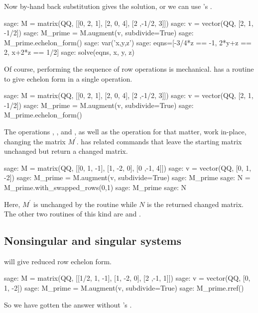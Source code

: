 Now by-hand back substitution gives the solution, or we can 
use \Sage's .
\begin{sagecommandline}
sage: M = matrix(QQ, [[0, 2, 1], [2, 0, 4], [2 ,-1/2, 3]])
sage: v = vector(QQ, [2, 1, -1/2])                        
sage: M_prime = M.augment(v, subdivide=True)
sage: M_prime.echelon_form()              
sage: var('x,y,z')
sage: eqns=[-3/4*z == -1, 2*y+z == 2, x+2*z == 1/2]
sage: solve(eqns, x, y, z)
\end{sagecommandline}

Of course, performing the sequence of row operations
is mechanical. 
\Sage{} has a routine to give echelon form in a single operation.
\begin{sagecommandline}
sage: M = matrix(QQ, [[0, 2, 1], [2, 0, 4], [2 ,-1/2, 3]])
sage: v = vector(QQ, [2, 1, -1/2])                        
sage: M_prime = M.augment(v, subdivide=True)              
sage: M_prime.echelon_form()                                            
\end{sagecommandline}

The operations ,
, and ,
as well as the operation  for that matter,
work in-place, changing the matrix $M^\prime$.
\Sage{} has related commands that leave the starting matrix unchanged
but return a changed matrix.
\begin{sagecommandline}
sage: M = matrix(QQ, [[0, 1, -1], [1, -2, 0], [0 ,-1, 4]])
sage: v = vector(QQ, [0, 1, -2])
sage: M_prime = M.augment(v, subdivide=True) 
sage: M_prime
sage: N = M_prime.with_swapped_rows(0,1)
sage: M_prime
sage: N      
\end{sagecommandline}
Here, $M^\prime$ is unchanged by the routine while $N$ is the returned 
changed matrix.
The other two routines of this kind are  
and .




\subsection{Nonsingular and singular systems}
\Sage{} will give reduced row echelon form.
\begin{sagecommandline}
sage: M = matrix(QQ, [[1/2, 1, -1], [1, -2, 0], [2 ,-1, 1]])
sage: v = vector(QQ, [0, 1, -2])
sage: M_prime = M.augment(v, subdivide=True) 
sage: M_prime.rref()
\end{sagecommandline}
So we have gotten the answer without \Sage's .

